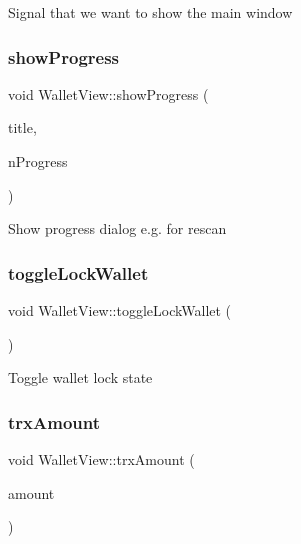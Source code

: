 Signal that we want to show the main window \mbox{\label{class_wallet_view_a8a1f4b689abc0f1073c547ec1f871a26}} 
\subsubsection{\texorpdfstring{showProgress}{showProgress}}
{\footnotesize\ttfamily void Wallet\+View\+::show\+Progress (\begin{DoxyParamCaption}\item[{const Q\+String \&}]{title,  }\item[{int}]{n\+Progress }\end{DoxyParamCaption})\hspace{0.3cm}{\ttfamily [slot]}}

Show progress dialog e.\+g. for rescan \mbox{\label{class_wallet_view_a739b3c92d336efb3cf1249a84d4deeab}} 
\subsubsection{\texorpdfstring{toggleLockWallet}{toggleLockWallet}}
{\footnotesize\ttfamily void Wallet\+View\+::toggle\+Lock\+Wallet (\begin{DoxyParamCaption}{ }\end{DoxyParamCaption})\hspace{0.3cm}{\ttfamily [slot]}}

Toggle wallet lock state \mbox{\label{class_wallet_view_ac4206b008b9c16dd6931aa56d9fb6fd4}} 
\subsubsection{\texorpdfstring{trxAmount}{trxAmount}}
{\footnotesize\ttfamily void Wallet\+View\+::trx\+Amount (\begin{DoxyParamCaption}\item[{Q\+String}]{amount }\end{DoxyParamCaption})\hspace{0.3cm}{\ttfamily [slot]}}

